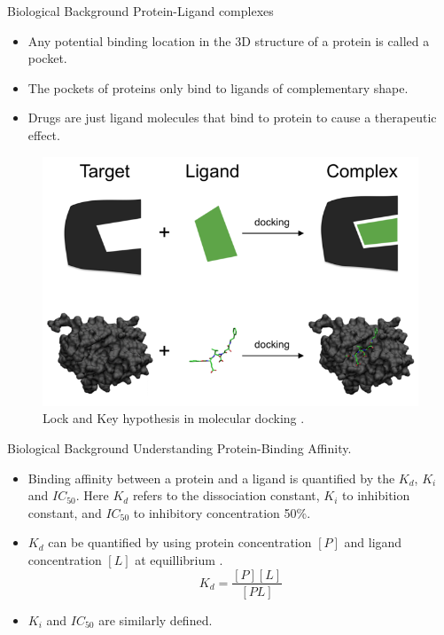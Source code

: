 \documentclass{beamer}
\begin{document}
\begin{frame}[t]{Biological Background}
Protein-Ligand complexes

\begin{itemize}
\item Any potential binding location in the 3D structure of a protein is called a
pocket.
\item The pockets of proteins only bind to ligands of complementary shape.
\item Drugs are just ligand molecules that bind to protein to cause a therapeutic effect.
\end{itemize}

\begin{figure}[htb]
  \centering
    \includegraphics[scale=0.45]{images/lock_and_key}
    \caption{Lock and Key hypothesis in molecular docking \cite{lockandkeyformatpng}.}
    \label{fig:lockandkey}
\end{figure}


\end{frame}

\begin{frame}[t]{Biological Background}
Understanding Protein-Binding Affinity.

\begin{itemize}
\item Binding affinity between a protein and a ligand is quantified by the $K_d$, $K_i$ and $IC_{50}$.
Here $K_d$ refers to the dissociation constant, $K_i$ to inhibition constant, and $IC_{50}$ to 
inhibitory concentration 50\%.
\item $K_d$ can be quantified by using protein concentration $[P]$ and ligand concentration $[L]$ at equillibrium \cite{proteinlingandbindingpaper}.
$$K_d = \frac{[P][L]}{[PL]}$$
\item $K_i$ and $IC_{50}$ are similarly defined.
\end{itemize}


\end{frame}
\end{document}
